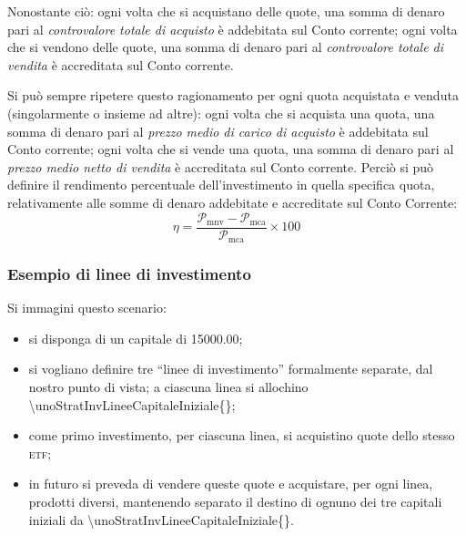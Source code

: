 \documentclass[12pt,a4paper]{article}
\newcommand{\Eur}[1]{\SI{#1}{\text{\euro{}}}}
\newcommand{\CalcoloRendimentoPercentualeSim}[2]{\frac{#1 - #2}{#2} \times{} \num{100}}
\newcommand{\Parentesi}[1]{(#1)}
\newcommand{\Virgolette}[1]{``#1''}
\newcommand{\Etf}[1]{\textsc{etf}}
\newcommand{\Pmc}[1]{\mathcal{P}_{\mathrm{mc}#1}}
\newcommand{\Pmca}[1]{\Pmc{\mathrm{a}#1}}
\newcommand{\Pmnv}[1]{\mathcal{P}_{\mathrm{mnv}#1}}
\begin{document}
Nonostante  ciò:  ogni  volta  che  si  acquistano   delle  quote,  una  somma  di  denaro  pari  al
\emph{controvalore totale di  acquisto} è addebitata sul  Conto corrente; ogni volta  che si vendono
delle quote,  una somma di denaro  pari al \emph{controvalore  totale di vendita} è  accreditata sul
Conto corrente.

Si   può   sempre   ripetere   questo   ragionamento   per   ogni   quota   acquistata   e   venduta
\Parentesi{singolarmente o  insieme ad altre}: ogni  volta che si  acquista una quota, una  somma di
denaro pari al \emph{prezzo medio di carico di acquisto} è addebitata sul Conto corrente; ogni volta
che  si vende  una  quota, una  somma di  denaro  pari al  \emph{prezzo  medio netto  di vendita}  è
accreditata sul Conto corrente.  Perciò si  può definire il rendimento percentuale dell'investimento
in quella  specifica quota, relativamente  alle somme di denaro  addebitate e accreditate  sul Conto
Corrente:
\begin{equation*}
  \eta = \CalcoloRendimentoPercentualeSim{\Pmnv{}}{\Pmca{}}
\end{equation*}


\subsubsection{Esempio di linee di investimento}


Si immagini questo scenario:
\begin{itemize}
\item si disponga di un capitale di \Eur{15000,00};
\item si vogliano  definire tre \Virgolette{linee di investimento} formalmente  separate, dal nostro
  punto di vista; a ciascuna linea si allochino \Eur{\unoStratInvLineeCapitaleIniziale{}};
\item come primo investimento, per ciascuna linea, si acquistino quote dello stesso \Etf{};
\item in futuro si  preveda di vendere queste quote e acquistare, per  ogni linea, prodotti diversi,
  mantenendo    separato    il    destino    di    ognuno   dei    tre    capitali    iniziali    da
  \Eur{\unoStratInvLineeCapitaleIniziale{}}.
\end{itemize}
\end{document}
